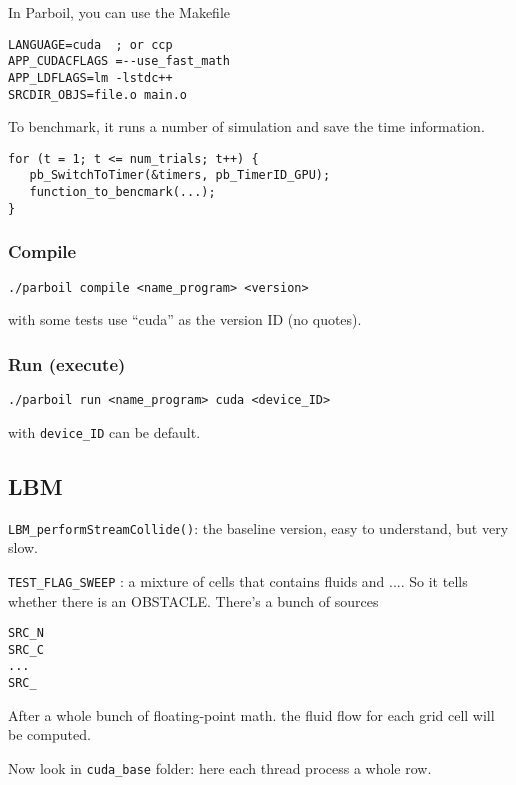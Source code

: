 In Parboil, you can use the Makefile
\begin{verbatim}
LANGUAGE=cuda  ; or ccp
APP_CUDACFLAGS =--use_fast_math
APP_LDFLAGS=lm -lstdc++
SRCDIR_OBJS=file.o main.o
\end{verbatim}


To benchmark, it runs a number of simulation and save the time
information. 
\begin{lstlisting}
for (t = 1; t <= num_trials; t++) {
   pb_SwitchToTimer(&timers, pb_TimerID_GPU);
   function_to_bencmark(...);
}

\end{lstlisting}


\subsubsection{Compile}
\label{sec:compile}

\begin{verbatim}
./parboil compile <name_program> <version>
\end{verbatim}
with some tests use ``cuda'' as the version ID (no quotes). 


\subsubsection{Run (execute)}
\label{sec:run-execute}

\begin{verbatim}
./parboil run <name_program> cuda <device_ID>
\end{verbatim}
with \verb!device_ID! can be default.


\subsection{LBM}
\label{sec:lbm}

\verb!LBM_performStreamCollide()!: the baseline version, easy to
understand, but very slow. 



\verb!TEST_FLAG_SWEEP! : a mixture of cells that contains fluids and
.... So it tells whether there is an OBSTACLE. There's a bunch of
sources
\begin{verbatim}
SRC_N
SRC_C
...
SRC_
\end{verbatim}

After a whole bunch of floating-point math. the fluid flow for each
grid cell will be computed. 

Now look in \verb!cuda_base! folder: here each thread process a whole
row. 


